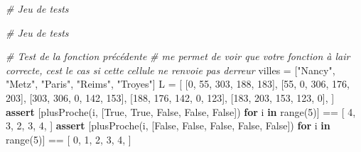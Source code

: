 \documentclass[
  paper=a4,
  ,captions=tableheading
]{scrartcl}
\newenvironment{Shaded}{}{}
\newcommand{\BuiltInTok}[1]{\textcolor[rgb]{0.00,0.50,0.00}{#1}}
\newcommand{\CommentTok}[1]{\textcolor[rgb]{0.38,0.63,0.69}{\textit{#1}}}
\newcommand{\ControlFlowTok}[1]{\textcolor[rgb]{0.00,0.44,0.13}{\textbf{#1}}}
\newcommand{\DecValTok}[1]{\textcolor[rgb]{0.25,0.63,0.44}{#1}}
\newcommand{\KeywordTok}[1]{\textcolor[rgb]{0.00,0.44,0.13}{\textbf{#1}}}
\newcommand{\NormalTok}[1]{#1}
\newcommand{\OperatorTok}[1]{\textcolor[rgb]{0.40,0.40,0.40}{#1}}
\newcommand{\StringTok}[1]{\textcolor[rgb]{0.25,0.44,0.63}{#1}}
\newcommand{\VariableTok}[1]{\textcolor[rgb]{0.10,0.09,0.49}{#1}}
\begin{document}
\begin{Shaded}
\begin{Highlighting}[]
\CommentTok{\# Jeu de tests}
\end{Highlighting}
\end{Shaded}

\begin{Shaded}
\begin{Highlighting}[]
\CommentTok{\# Jeu de tests}
\end{Highlighting}
\end{Shaded}

\begin{Shaded}
\begin{Highlighting}[]
\CommentTok{\# Test de la fonction précédente}
\CommentTok{\# me permet de voir que votre fonction à l\textquotesingle{}air correcte, c\textquotesingle{}est le cas si cette cellule ne renvoie pas d\textquotesingle{}erreur}
\NormalTok{villes }\OperatorTok{=}\NormalTok{ [}\StringTok{"Nancy"}\NormalTok{, }\StringTok{"Metz"}\NormalTok{, }\StringTok{"Paris"}\NormalTok{, }\StringTok{"Reims"}\NormalTok{, }\StringTok{"Troyes"}\NormalTok{]}
\NormalTok{L }\OperatorTok{=}\NormalTok{ [}
\NormalTok{    [}\DecValTok{0}\NormalTok{, }\DecValTok{55}\NormalTok{, }\DecValTok{303}\NormalTok{, }\DecValTok{188}\NormalTok{, }\DecValTok{183}\NormalTok{],}
\NormalTok{    [}\DecValTok{55}\NormalTok{, }\DecValTok{0}\NormalTok{, }\DecValTok{306}\NormalTok{, }\DecValTok{176}\NormalTok{, }\DecValTok{203}\NormalTok{],}
\NormalTok{    [}\DecValTok{303}\NormalTok{, }\DecValTok{306}\NormalTok{, }\DecValTok{0}\NormalTok{, }\DecValTok{142}\NormalTok{, }\DecValTok{153}\NormalTok{],}
\NormalTok{    [}\DecValTok{188}\NormalTok{, }\DecValTok{176}\NormalTok{, }\DecValTok{142}\NormalTok{, }\DecValTok{0}\NormalTok{, }\DecValTok{123}\NormalTok{],}
\NormalTok{    [}\DecValTok{183}\NormalTok{, }\DecValTok{203}\NormalTok{, }\DecValTok{153}\NormalTok{, }\DecValTok{123}\NormalTok{, }\DecValTok{0}\NormalTok{],}
\NormalTok{]}
\ControlFlowTok{assert}\NormalTok{ [plusProche(i, [}\VariableTok{True}\NormalTok{, }\VariableTok{True}\NormalTok{, }\VariableTok{False}\NormalTok{, }\VariableTok{False}\NormalTok{, }\VariableTok{False}\NormalTok{]) }\ControlFlowTok{for}\NormalTok{ i }\KeywordTok{in} \BuiltInTok{range}\NormalTok{(}\DecValTok{5}\NormalTok{)] }\OperatorTok{==}\NormalTok{ [}
    \DecValTok{4}\NormalTok{,}
    \DecValTok{3}\NormalTok{,}
    \DecValTok{2}\NormalTok{,}
    \DecValTok{3}\NormalTok{,}
    \DecValTok{4}\NormalTok{,}
\NormalTok{]}
\ControlFlowTok{assert}\NormalTok{ [plusProche(i, [}\VariableTok{False}\NormalTok{, }\VariableTok{False}\NormalTok{, }\VariableTok{False}\NormalTok{, }\VariableTok{False}\NormalTok{, }\VariableTok{False}\NormalTok{]) }\ControlFlowTok{for}\NormalTok{ i }\KeywordTok{in} \BuiltInTok{range}\NormalTok{(}\DecValTok{5}\NormalTok{)] }\OperatorTok{==}\NormalTok{ [}
    \DecValTok{0}\NormalTok{,}
    \DecValTok{1}\NormalTok{,}
    \DecValTok{2}\NormalTok{,}
    \DecValTok{3}\NormalTok{,}
    \DecValTok{4}\NormalTok{,}
\NormalTok{]}
\end{Highlighting}
\end{Shaded}
\end{document}
